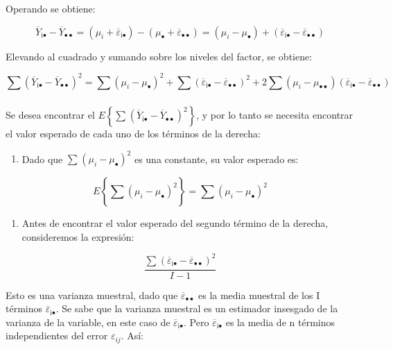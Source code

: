 \documentclass[]{book}
\providecommand{\tightlist}{%
  \setlength{\itemsep}{0pt}\setlength{\parskip}{0pt}}
\theoremstyle{definition}
\theoremstyle{definition}
\theoremstyle{definition}
\theoremstyle{remark}
\begin{document}
Operando se obtiene:

\[
{\overline{Y}}_{\text{i}\bullet} - {\overline{Y}}_{\bullet \bullet} = \left( \mu_{i} + {\overline{\varepsilon}}_{\text{i}\bullet} \right) - \left( \mu_{\bullet} + {\overline{\varepsilon}}_{\bullet \bullet} \right) = \left( \mu_{i} - \mu_{\bullet} \right) + \left( {\overline{\varepsilon}}_{\text{i}\bullet} - {\overline{\varepsilon}}_{\bullet \bullet} \right)
\]

Elevando al cuadrado y sumando sobre los niveles del factor, se obtiene:

\[\sum_{}^{}\left( {\overline{Y}}_{\text{i}\bullet} - {\overline{Y}}_{\bullet \bullet}
\right)^{2} = \sum_{}^{}\left( \mu_{i} - \mu_{\bullet} \right)^{2} +
\sum_{}^{}\left( {\overline{\varepsilon}}_{\text{i}\bullet} -
{\overline{\varepsilon}}_{\bullet \bullet} \right)^{2} + 2\sum_{}^{}\left(
\mu_{i} - \mu_{\bullet \bullet} \right)\left(
{\overline{\varepsilon}}_{\text{i}\bullet} - {\overline{\varepsilon}}_{\bullet
\bullet} \right)\]

Se desea encontrar el
\(E\left\{ \sum_{}^{}\left( {\overline{Y}}_{\text{i}\bullet}  - {\overline{Y}}_{\bullet \bullet} \right)^{2} \right\}\),
y por lo tanto se necesita encontrar el valor esperado de cada uno de
los términos de la derecha:

\begin{enumerate}
\def\labelenumi{\arabic{enumi}.}
\setcounter{enumi}{2}
\tightlist
\item
  Dado que \(\sum_{}^{}\left( \mu_{i} - \mu_{\bullet} \right)^{2}\) es
  una constante, su valor esperado es:
\end{enumerate}

\[
E\left\{ \sum_{}^{}\left( \mu_{i} - \mu_{\bullet} \right)^{2} \right\} = \sum_{}^{}\left( \mu_{i} - \mu_{\bullet} \right)^{2}
\]

\begin{enumerate}
\def\labelenumi{\arabic{enumi}.}
\setcounter{enumi}{3}
\tightlist
\item
  Antes de encontrar el valor esperado del segundo término de la
  derecha, consideremos la expresión:
\end{enumerate}

\[
\frac{\sum_{}^{}\left( {\overline{\varepsilon}}_{\text{i}\bullet} - \overline{\varepsilon}_{\bullet\bullet} \right)^{2}}{I - 1}
\]

Esto es una varianza muestral, dado que
\({\overline{\varepsilon}}_{\bullet\bullet}\) es la media muestral de
los I términos \({\overline{\varepsilon}}_{\text{i}\bullet}\). Se sabe
que la varianza muestral es un estimador insesgado de la varianza de la
variable, en este caso de
\({\overline{\varepsilon}}_{\text{i}\bullet}\). Pero
\({\overline{\varepsilon}}_{\text{i}\bullet}\) es la media de n términos
independientes del error \(\varepsilon_{ij}\). Así:
\end{document}
